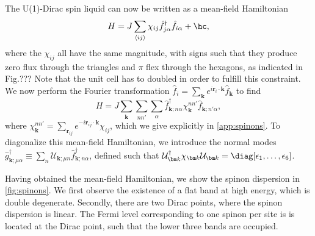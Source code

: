 The U(1)-Dirac spin liquid can now be written as a mean-field Hamiltonian
\begin{equation}
	H = J \sum_{\langle ij\rangle} \chi_{ij} \hat f_{j\alpha}^\dagger \hat f_{i\alpha} + \hc,
\end{equation}
where the $ \chi_{ij}$ all have the same magnitude, with signs such that they produce zero flux through the triangles and $\pi$ flex through the hexagons, as indicated in Fig.??? Note that the unit cell has to doubled in order to fulfill this constraint. We now perform the Fourier transformation $\hat f_i=\sum_{\bm k}e^{i\bm r_i\cdot\bm k} \hat f_{\bm k}$ to find 
\begin{equation}
	H = J\sum_{\bm k}\sum_{nn'}\sum_\alpha \hat f_{\bm k;n\alpha}^\dagger \chi_{\bm k}^{nn'}\hat f_{\bm k;n'\alpha},
\end{equation}
where $\chi_{\bm k}^{nn'}=\sum_{\bm r_{ij}}e^{-i\bm r_{ij}\cdot \bm k} \chi_{ij}$, which we give explicitly in \cref{app:spinons}. To diagonalize this mean-field Hamiltonian, we introduce the normal modes
$\hat g_{\bm k;\mu\alpha}^\dagger\equiv \sum_{n} \mathcal U_{\bm k;\mu n}\hat f_{\bm k;n\alpha}^\dagger $, defined such that $\mathcal U_{\bm k}^\dagger \chi_{\bm k}\mathcal U_{\bm k}=\diag[\epsilon_1,\dots,\epsilon_6]$.

Having obtained the mean-field Hamiltonian, we show the spinon dispersion in \cref{fig:spinons}. We first observe the existence of a flat band at high energy, which is double degenerate. Secondly, there are two Dirac points, where the spinon dispersion is linear. The Fermi level corresponding to one spinon per site is is located at the Dirac point, such that the lower three bands are occupied.

